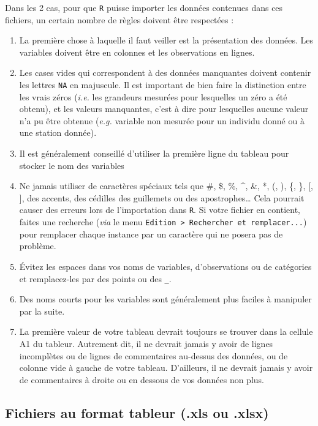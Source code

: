 \documentclass[
  letterpaper,
  DIV=11,
  numbers=noendperiod]{scrreprt}
\providecommand{\tightlist}{%
  \setlength{\itemsep}{0pt}\setlength{\parskip}{0pt}}\usepackage{longtable,booktabs,array}
\begin{document}
Dans les 2 cas, pour que \texttt{R} puisse importer les données
contenues dans ces fichiers, un certain nombre de règles doivent être
respectées :

\begin{enumerate}
\def\labelenumi{\arabic{enumi}.}
\tightlist
\item
  La première chose à laquelle il faut veiller est la présentation des
  données. Les variables doivent être en colonnes et les observations en
  lignes.
\item
  Les cases vides qui correspondent à des données manquantes doivent
  contenir les lettres \texttt{NA} en majuscule. Il est important de
  bien faire la distinction entre les vrais zéros (\emph{i.e.} les
  grandeurs mesurées pour lesquelles un zéro a été obtenu), et les
  valeurs manquantes, c'est à dire pour lesquelles aucune valeur n'a pu
  être obtenue (\emph{e.g.} variable non mesurée pour un individu donné
  ou à une station donnée).
\item
  Il est généralement conseillé d'utiliser la première ligne du tableau
  pour stocker le nom des variables
\item
  Ne jamais utiliser de caractères spéciaux tels que \#, \$, \%, \^{},
  \&, *, (, ), \{, \}, {[}, {]}, des accents, des cédilles des
  guillemets ou des apostrophes\ldots{} Cela pourrait causer des erreurs
  lors de l'importation dans \texttt{R}. Si votre fichier en contient,
  faites une recherche (\emph{via} le menu
  \texttt{Edition\ \textgreater{}\ Rechercher\ et\ remplacer...}) pour
  remplacer chaque instance par un caractère qui ne posera pas de
  problème.
\item
  Évitez les espaces dans vos noms de variables, d'observations ou de
  catégories et remplacez-les par des points ou des \texttt{\_}.
\item
  Des noms courts pour les variables sont généralement plus faciles à
  manipuler par la suite.
\item
  La première valeur de votre tableau devrait toujours se trouver dans
  la cellule A1 du tableur. Autrement dit, il ne devrait jamais y avoir
  de lignes incomplètes ou de lignes de commentaires au-dessus des
  données, ou de colonne vide à gauche de votre tableau. D'ailleurs, il
  ne devrait jamais y avoir de commentaires à droite ou en dessous de
  vos données non plus.
\end{enumerate}

\hypertarget{tableur}{%
\subsection{Fichiers au format tableur (.xls ou .xlsx)}\label{tableur}}
\end{document}
